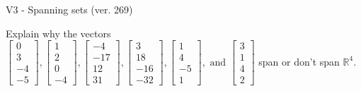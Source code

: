 \begin{exercise}
  \begin{exerciseTitle}V3 - Spanning sets (ver. 269)\end{exerciseTitle}
  \begin{exerciseStatement}
    Explain why the vectors \(\left[\begin{array}{r}
0 \\
3 \\
-4 \\
-5
\end{array}\right] , \left[\begin{array}{r}
1 \\
2 \\
0 \\
-4
\end{array}\right] , \left[\begin{array}{r}
-4 \\
-17 \\
12 \\
31
\end{array}\right] , \left[\begin{array}{r}
3 \\
18 \\
-16 \\
-32
\end{array}\right] , \left[\begin{array}{r}
1 \\
4 \\
-5 \\
1
\end{array}\right] , \text{ and } \left[\begin{array}{r}
3 \\
1 \\
4 \\
2
\end{array}\right]\) span or don't span \(\mathbb{R}^4\). 
	



\end{exerciseStatement}
\end{exercise}
